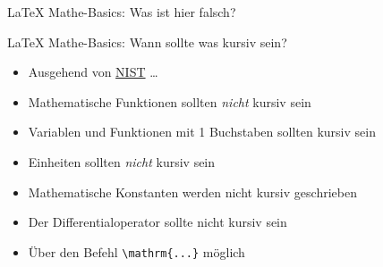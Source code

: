 \documentclass[main.tex]{subfiles}
\begin{document}
\begin{frame}[fragile]{\LaTeX{} Mathe-Basics: Was ist hier falsch?}

\end{frame}


\begin{frame}[fragile]{\LaTeX{} Mathe-Basics: Wann sollte was kursiv sein?}
    \begin{itemize}
        \item Ausgehend von \href{https://physics.nist.gov/cuu/pdf/typefaces.pdf}{NIST} \ldots
        \pause
        \medskip
        \item Mathematische Funktionen sollten \textit{nicht} kursiv sein
        \pause

        \item Variablen und Funktionen mit 1 Buchstaben sollten kursiv sein
        \pause

        \item Einheiten sollten \textit{nicht} kursiv sein
        \pause

        \item Mathematische Konstanten werden nicht kursiv geschrieben
        \pause

        \item Der Differentialoperator sollte nicht kursiv sein

        \medskip
        \item Über den Befehl \verb|\mathrm{...}| möglich
    \end{itemize}
\end{frame}
\end{document}
